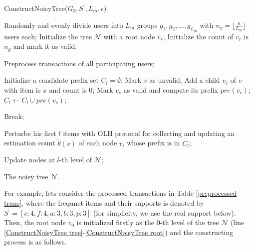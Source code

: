 \documentclass[conference]{IEEEtran}
\begin{document}
\begin{algorithm}[htbp]
  \caption{ConstructNoisyTree($G_3,S^{\prime},L_m,\epsilon$)}
  \label{alg ConstructNoisyTree}
  \begin{algorithmic}[1]
  \STATE Randomly and evenly divide users into $L_m$ groups $g_1,g_2,...,g_{L_m}$ with $n_g = \lfloor \frac{n}{L_m} \rfloor$ users each;
  \STATE Initialize the tree $\mathcal{N}$ with a root node $v_r$; \label{ConstructNoisyTree tree}
  \STATE Initialize the count of $v_r$ is $n_g$ and mark it as valid;\label{ConstructNoisyTree root}

  \STATE Preprocess transactions of all participating users;

      \STATE Initialize a candidate prefix set $C_l = \emptyset$;
      \STATE Mark $v$ as unvalid;
       \label{ConstructNoisyTree add child}
        \STATE Add a child $v_c$ of $v$ with item is $x$ and count is 0;\label{ConstructNoisyTree child}
        \STATE Mark $v_c$ as valid and compute its prefix $pre(v_c)$;\label{ConstructNoisyTree child prefix}
        \STATE $C_l \gets C_l \cup pre(v_c)$;\label{ConstructNoisyTree child prefix set}
      \ENDFOR
    \ENDWHILE
 
    \STATE Break;
    \ENDIF
    

     \label{ConstructNoisyTree estimate}
    \STATE Perturbe his first $l$ items with OLH protocol for collecting and updating an estimation count $\tilde{\theta}(v)$ of each node $v$, whose prefix is in $C_{l}$;
    \ENDFOR

    \STATE Update nodes at $l$-th level of $\mathcal{N}$; \label{ConstructNoisyTree update}
  \ENDFOR

  \RETURN The noisy tree $\mathcal{N}$.
  
  \end{algorithmic}
\end{algorithm}

For example, lets consider the processed transactions in Table \ref{preprocessed trans}, where the frequnet items and their supports is denoted by $S^{\prime} = \left[c:4 , f:4 , a:3 , b:3, p:3  \right]$ (for simplicity, we use the real support below). Then, the root node $v_0$ is initialized firstly as the 0-th level of the tree $\mathcal{N}$ (line \ref{ConstructNoisyTree tree}-\ref{ConstructNoisyTree root}) and the constructing process is as follows.
\end{document}

